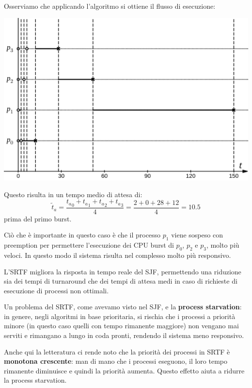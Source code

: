 \documentclass[a4paper,11pt]{article}
\begin{document}
Osserviamo che applicando l'algoritmo si ottiene il flusso di esecuzione:
\begin{center}
	\includegraphics[scale=0.3]{../figures/srtf.png}
\end{center}

Questo risulta in un tempo medio di attesa di:
$$
\tilde{t}_a = \frac{{t_a}_0 + {t_a}_1 + {t_a}_2 + {t_a}_3}{4} = \frac{2 + 0 + 28 + 12}{4} = 10.5
$$
prima del primo burst.

Ciò che è importante in questo caso è che il processo $p_1$ viene sospeso con preemption per permettere l'esecuzione dei CPU burst di $p_0$, $p_2$ e $p_3$, molto più veloci. In questo modo il sistema risulta nel complesso molto più responsivo.

\par\smallskip

L'SRTF migliora la risposta in tempo reale del SJF, permettendo una riduzione sia dei tempi di turnaround che dei tempi di attesa medi in caso di richieste di esecuzione di processi non ottimali. 

Un problema del SRTF, come avevamo visto nel SJF, e la \textbf{process starvation}: in genere, negli algoritmi in base prioritaria, si rischia che i processi a priorità minore (in questo caso quelli con tempo rimanente maggiore) non vengano mai serviti e rimangano a lungo in coda pronti, rendendo il sistema meno responsivo.

Anche qui la letteratura ci rende noto che la priorità dei processi in SRTF è \textbf{monotona crescente}: man di mano che i processi eseguono, il loro tempo rimanente diminuisce e quindi la priorità aumenta. Questo effetto aiuta a ridurre la process starvation.
\end{document}
